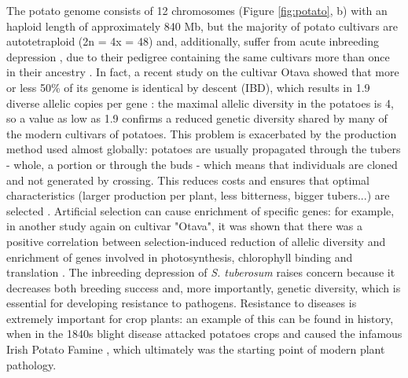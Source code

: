 \documentclass[a4paper, 12pt]{report}
\begin{document}
The potato genome consists of 12 chromosomes (Figure \ref{fig:potato}, b) with an haploid length of approximately 840 Mb, but the majority of potato cultivars are autotetraploid (2n = 4x = 48) and, additionally, suffer from acute inbreeding depression \parencite{xuGenomeSequenceAnalysis2011}, due to their pedigree containing the same cultivars more than once in their ancestry \parencite{sunChromosomescaleHaplotyperesolvedGenome2022}. In fact, a recent study on the cultivar Otava showed that more or less 50\% of its genome is identical by descent (IBD), which results in 1.9 diverse allelic copies per gene \parencite{kuiSolanumTuberosumPotato2022}: the maximal allelic diversity in the potatoes is 4, so a value as low as 1.9 confirms a reduced genetic diversity shared by many of the modern cultivars of potatoes. This problem is exacerbated by the production method used almost globally: potatoes are usually propagated through the tubers - whole, a portion \parencite{reddyReviewPotatoSolanum2018} or through the buds \parencite{wangStudyCultivationSeedlings2022} - which means that individuals are cloned and not generated by crossing. This reduces costs and ensures that optimal characteristics (larger production per plant, less bitterness, bigger tubers...) are selected \parencite{wangStudyCultivationSeedlings2022}. Artificial selection can cause enrichment of specific genes: for example, in another study again on cultivar "Otava", it was shown that there was a positive correlation between selection-induced reduction of allelic diversity and enrichment of genes involved in photosynthesis, chlorophyll binding and translation \parencite{sunChromosomescaleHaplotyperesolvedGenome2022}. The inbreeding depression of \textit{S. tuberosum} raises concern because it decreases both breeding success \parencite{sunChromosomescaleHaplotyperesolvedGenome2022} and, more importantly, genetic diversity, which is essential for developing resistance to pathogens. Resistance to diseases is extremely important for crop plants: an example of this can be found in history, when in the 1840s blight disease attacked potatoes crops and caused the infamous Irish Potato Famine \parencite{wangStudyCultivationSeedlings2022}, which ultimately was the starting point of modern plant pathology.
\end{document}
